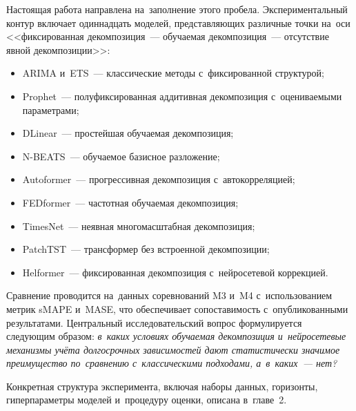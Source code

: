 Настоящая работа направлена на~заполнение этого пробела.
Экспериментальный контур включает одиннадцать моделей, представляющих
различные точки на~оси <<фиксированная декомпозиция~--- обучаемая
декомпозиция~--- отсутствие явной декомпозиции>>:
\begin{itemize}[nosep]
\item ARIMA и~ETS~--- классические методы с~фиксированной структурой;
\item Prophet~--- полуфиксированная аддитивная декомпозиция
   с~оцениваемыми параметрами;
\item DLinear~--- простейшая обучаемая декомпозиция;
\item N-BEATS~--- обучаемое базисное разложение;
\item Autoformer~--- прогрессивная декомпозиция с~автокорреляцией;
\item FEDformer~--- частотная обучаемая декомпозиция;
\item TimesNet~--- неявная многомасштабная декомпозиция;
\item PatchTST~--- трансформер без встроенной декомпозиции;
\item Helformer~--- фиксированная декомпозиция с~нейросетевой коррекцией.
\end{itemize}

Сравнение проводится на~данных соревнований M3 и~M4 с~использованием
метрик sMAPE и~MASE, что обеспечивает сопоставимость с~опубликованными
результатами.  Центральный исследовательский вопрос формулируется
следующим образом: \textit{в~каких условиях обучаемая декомпозиция
и~нейросетевые механизмы учёта долгосрочных зависимостей дают
статистически значимое преимущество по~сравнению с~классическими
подходами, а~в~каких~--- нет?}

Конкретная структура эксперимента, включая наборы данных, горизонты,
гиперпараметры моделей и~процедуру оценки, описана в~главе~2.
